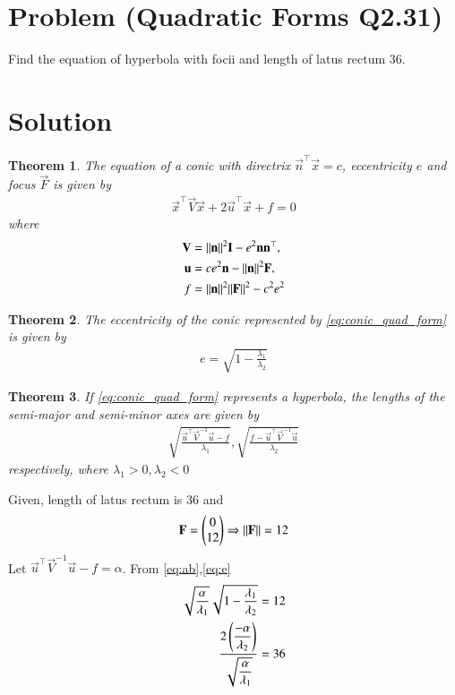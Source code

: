 \documentclass[journal,12pt,twocolumn]{IEEEtran}
\newtheorem{theorem}{Theorem}[section]
\begin{document}
\section{Problem (Quadratic Forms Q2.31)}
Find the equation of hyperbola with focii  and length of latus rectum 36.
\section{Solution}
\begin{theorem}
The equation of  a conic with directrix $\vec{n}^{\top}\vec{x} = c$, eccentricity $e$ and focus $\vec{F}$ is given by 
\begin{align}
    \label{eq:conic_quad_form}
    \vec{x}^{\top}\vec{V}\vec{x}+2\vec{u}^{\top}\vec{x}+f=0
    \end{align}
where     
\begin{align}
\label{eq:conic_quad_form_v}
\mathbf{V} &=\lVert\mathbf{n}\rVert^2\mathbf{I}-e^2\mathbf{n}\mathbf{n}^{\top}, \\
\label{eq:conic_quad_form_u}
\mathbf{u} &= ce^2\mathbf{n}-\lVert\mathbf{n}\rVert^2\mathbf{F}, \\
\label{eq:conic_quad_form_f}
f &= \lVert\mathbf{n}\rVert^2\lVert\mathbf{F}\rVert^2-c^2e^2
\end{align}
\end{theorem}
\begin{theorem}
The eccentricity of the conic represented by \eqref{eq:conic_quad_form} is given by
\begin{align}
e= \sqrt{1-\frac{\lambda_1}{\lambda_2}}
\label{eq:e}
\end{align}
\end{theorem}
\begin{theorem}
If \eqref{eq:conic_quad_form} represents a hyperbola, the lengths of the semi-major and semi-minor axes are given by
\begin{align}
\sqrt{\frac{\vec{u}^{\top}\vec{V}^{-1}\vec{u} -f}{\lambda_1}}, 
       \sqrt{\frac{f-\vec{u}^{\top}\vec{V}^{-1}\vec{u}}{\lambda_2}}
       \label{eq:ab}
\end{align}
respectively, where $\lambda_1>0,\lambda_2<0$
\end{theorem}
Given, length of latus rectum is 36 and
\begin{align}
    \mathbf{F} =\begin{pmatrix}0\\ 12\end{pmatrix}\Rightarrow\lVert\mathbf{F}\rVert=12
\end{align}
Let $\vec{u}^{\top}\vec{V}^{-1}\vec{u}-f=\alpha$. From \eqref{eq:ab},\eqref{eq:e} 
\begin{align}
    \sqrt{\frac{\alpha}{\lambda_1}}\sqrt{1-\frac{\lambda_1}{\lambda_2}}=12\label{eq:one}\\
    \dfrac{2\left(\dfrac{-\alpha}{\lambda_2}\right)}{\sqrt{\dfrac{\alpha}{\lambda_1}}}=36\label{eq:two}
\end{align}
\end{document}

